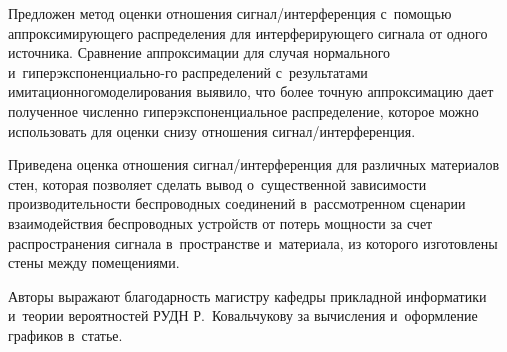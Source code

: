 \begin{multicols}{2}
  Предложен метод оценки отношения сиг\-нал/\linebreak ин\-тер\-фе\-рен\-ция  
с~по\-мощью ап\-прок\-си\-ми\-ру\-юще\-го распределения для интерферирующего 
сигнала от одного источника. Сравнение аппроксимации для случая 
нормального и~гиперэкспоненциально-\linebreak го распределений с~результатами 
имитационного\linebreak моделирования выявило, что более точную аппроксимацию 
дает полученное численно гиперэкспоненциальное распределение, которое 
можно использовать для оценки снизу отношения  
сиг\-нал/\linebreak ин\-тер\-фе\-рен\-ция. 

Приведена оценка отношения 
  сиг\-нал/ин\-тер\-фе\-рен\-ция для различных материалов стен, которая 
позволяет сделать вывод о~существенной за\-ви\-си\-мости производительности 
беспроводных соединений в~рассмотренном сценарии взаимодействия 
беспроводных устройств от потерь мощности за счет распространения 
сигнала в~пространстве и~материала, из которого изготовлены стены между 
помещениями. 
  
  \smallskip
  
  Авторы выражают благодарность магистру кафедры прикладной 
информатики и~теории вероятностей РУДН Р.~Ковальчукову за вычисления 
и~оформление графиков в~статье.

\vspace*{-6pt}


\end{multicols}
